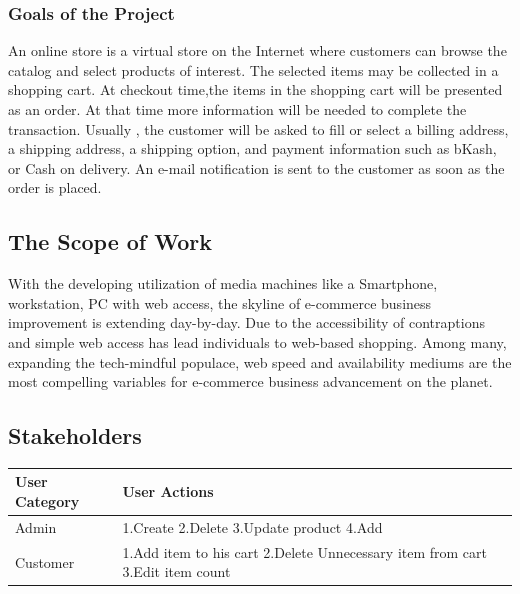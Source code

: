 \documentclass{article}
\begin{document}
\subsubsection{ Goals of the Project}
An online store is a virtual store on the Internet where customers can browse the catalog and select products of interest. The selected items may be collected in a shopping cart. At checkout time,the items in the shopping cart will be presented as an order. At that time more information will be needed to complete the transaction. Usually , the customer will be asked to fill or select a billing address, a shipping address, a shipping option, and payment information such as bKash, or Cash on delivery. An e-mail notification is sent to the customer as soon as the order is placed.
\subsection{The Scope of Work}
With the developing utilization of media machines like a Smartphone, workstation, PC with web access, the skyline of e-commerce business improvement is extending day-by-day. Due to the accessibility of contraptions and simple web access has lead individuals to web-based shopping. Among many, expanding the tech-mindful populace, web speed and availability mediums are the most compelling variables for e-commerce business advancement on the planet.




\subsection{Stakeholders}
\begin{tabular}{ |p{4cm}|p{4cm}|}
 \hline
 User Category & User Actions\\
 \hline
 
 

Admin & 
1.Create
2.Delete
3.Update product
4.Add\\
 \hline
 
 Customer &
 1.Add item to his cart
 2.Delete Unnecessary item from cart
 3.Edit item count

 \\

\hline
\end{tabular}



 
 
 
 
\end{document}
